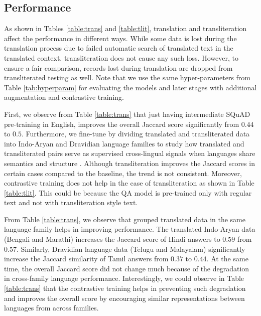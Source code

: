 \documentclass[11pt]{article}
\begin{document}
\subsection{Performance}

As shown in Tables \ref{table:trans} and \ref{table:tlit}, translation and transliteration affect the performance in different ways. While some data is lost during the translation process due to failed automatic search of translated text in the translated context. transliteration does not cause any such loss. However, to ensure a fair comparison, records lost during translation are dropped from transliterated testing as well. Note that we use the same hyper-parameters from Table \ref{tab:hyperparam} for evaluating the models and later stages with additional augmentation and contrastive training.

First, we observe from Table \ref{table:trans} that just having intermediate SQuAD pre-training in English, improves the overall Jaccard score significantly from $0.44$ to $0.5$. Furthermore, we fine-tune by dividing translated and transliterated data into Indo-Aryan and Dravidian language families to study how translated and transliterated pairs serve as supervised cross-lingual signals when languages share semantics and structure \cite{mikolov2013exploiting}. Although transliteration improves the Jaccard scores in certain cases compared to the baseline, the trend is not consistent. Moreover, contrastive training does not help in the case of transliteration as shown in Table \ref{table:tlit}. This could be because the QA model is pre-trained only with regular text and not with transliteration style text.

From Table \ref{table:trans}, we observe that grouped translated data in the same language family helps in improving performance. The translated Indo-Aryan data (Bengali and Marathi) increases the Jaccard score of Hindi answers to $0.59$ from $0.57$. Similarly, Dravidian language data (Telugu and Malayalam) significantly increase the Jaccard similarity of Tamil answers from $0.37$ to $0.44$. At the same time, the overall Jaccard score did not change much because of the degradation in cross-family language performance. Interestingly, we could observe in Table \ref{table:trans} that the contrastive training helps in preventing such degradation and improves the overall score by encouraging similar representations between languages from across families.
\end{document}
